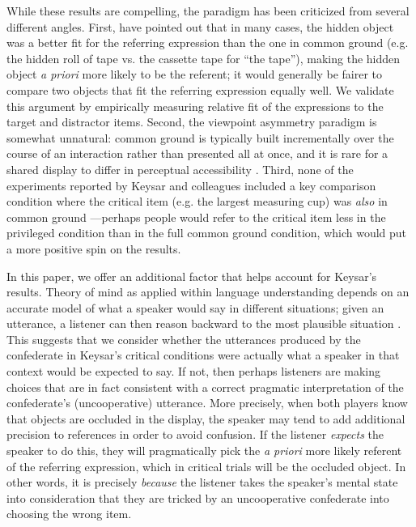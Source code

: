 \documentclass[10pt,letterpaper]{article}
\begin{document}
While these results are compelling, the paradigm has been criticized from several different angles. 
First,  have pointed out that in many cases, the hidden object was a better fit for the referring expression than the one in common ground (e.g. the hidden roll of tape vs. the cassette tape for ``the tape''), making the hidden object \emph{a priori} more likely to be the referent; it would generally be fairer to compare two objects that fit the referring expression equally well. 
We validate this argument by empirically measuring relative fit of the expressions to the target and distractor items.
Second, the viewpoint asymmetry paradigm is somewhat unnatural: common ground is typically built incrementally over the course of an interaction rather than presented all at once, and it is rare for a shared display to differ in perceptual accessibility \cite{HannaTanenhausTrueswell03_CommonGroundPerspective}. 
Third, none of the experiments reported by Keysar and colleagues included a key comparison condition where the critical item (e.g. the largest measuring cup) was \emph{also} in common ground \cite{BrownSchmidtHanna11_IncrementalPerspectiveTaking}---perhaps people would refer to the critical item less in the privileged condition than in the full common ground condition, which would put a more positive spin on the results. %

In this paper, we offer an additional factor that helps account for Keysar's results. 
Theory of mind as applied within language understanding depends on an accurate model of what a speaker would say in different situations; given an utterance, a listener can then reason backward to the most plausible situation \cite{grice,clark,FrankGoodman12_PragmaticReasoningLanguageGames, GoodmanStuhlmuller13_KnowledgeImplicature}.
This suggests that we consider whether the utterances produced by the confederate in Keysar's critical conditions were actually what a speaker in that context would be expected to say. 
If not, then perhaps listeners are making choices that are in fact consistent with a correct pragmatic interpretation of the confederate's (uncooperative) utterance.
More precisely, when both players know that objects are occluded in the display, the speaker may tend to add additional precision to references in order to avoid confusion. If the listener \emph{expects} the speaker to do this, they will pragmatically pick the \emph{a priori} more likely referent of the referring expression, which in critical trials will be the occluded object. In other words, it is precisely \emph{because} the listener takes the speaker's mental state into consideration that they are tricked by an uncooperative confederate into choosing the wrong item. 
\end{document}
